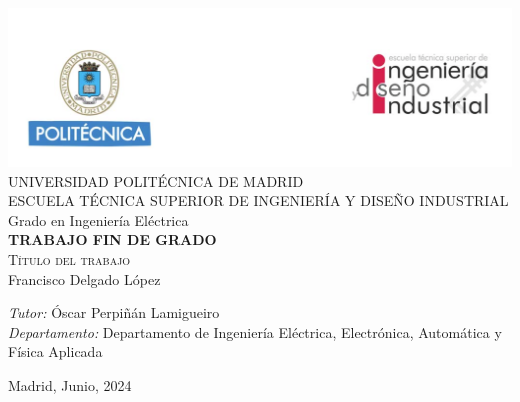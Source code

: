 \begin{center}
	
	\thispagestyle{empty}
		
	\includegraphics[width=1\textwidth]{figuras/cabecera.png}  \\[0.5 cm]
		
	\LARGE UNIVERSIDAD POLITÉCNICA DE MADRID \\ [1 cm]
		
	\LARGE ESCUELA TÉCNICA SUPERIOR DE INGENIERÍA Y DISEÑO INDUSTRIAL \\ [1 cm]
		
	\LARGE Grado en Ingeniería Eléctrica\\ [1 cm]
		
	\LARGE \textbf{TRABAJO FIN DE GRADO}\\[1 cm]
		
	\Huge \textsc{Título del trabajo}\\[1 cm]
		
	\LARGE Francisco Delgado López \\[2 cm]
		
			
	\begin{flushleft} \Large
		\emph{Tutor:} Óscar Perpiñán Lamigueiro\\
		\emph{Departamento:} Departamento de Ingeniería Eléctrica, Electrónica, Automática y Física Aplicada
	\end{flushleft}
			
	
	\vfill
		
	{\large Madrid, Junio, 2024}
		
\end{center}
	
\cleardoublepage 